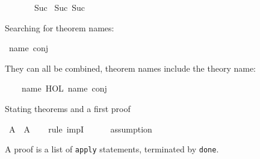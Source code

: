\begin{isabellebody}
\ {\isachardoublequoteopen}{\isacharunderscore}{\kern0pt}\ {\isacharplus}{\kern0pt}\ {\isacharunderscore}{\kern0pt}{\isachardoublequoteclose}\ {\isachardoublequoteopen}{\isacharunderscore}{\kern0pt}\ {\isacharless}{\kern0pt}\ {\isacharunderscore}{\kern0pt}{\isachardoublequoteclose}\ {\isachardoublequoteopen}Suc{\isachardoublequoteclose}\isanewline
{}\isamarkupfalse%
\ {\isachardoublequoteopen}Suc\ {\isacharparenleft}{\kern0pt}Suc\ {\isacharunderscore}{\kern0pt}{\isacharparenright}{\kern0pt}{\isachardoublequoteclose}%
\begin{isamarkuptext}%
Searching for theorem names:%
\end{isamarkuptext}\isamarkuptrue%
\isamarkupfalse%
\ name{\isacharcolon}{\kern0pt}\ {\isachardoublequoteopen}conj{\isachardoublequoteclose}%
\begin{isamarkuptext}%
They can all be combined, theorem names include the theory name:%
\end{isamarkuptext}\isamarkuptrue%
\isamarkupfalse%
\ {\isachardoublequoteopen}{\isacharunderscore}{\kern0pt}\ {\isasymand}\ {\isacharunderscore}{\kern0pt}{\isachardoublequoteclose}\ name{\isacharcolon}{\kern0pt}\ {\isachardoublequoteopen}HOL{\isachardot}{\kern0pt}{\isachardoublequoteclose}\ {\isacharminus}{\kern0pt}name{\isacharcolon}{\kern0pt}\ {\isachardoublequoteopen}conj{\isachardoublequoteclose}%
\isadelimdocument
%
\endisadelimdocument
%
\isatagdocument
%
\isamarkuptrue%
%
\endisatagdocument
{\isafolddocument}%
%
\isadelimdocument
%
\endisadelimdocument
%
\begin{isamarkuptext}%
Stating theorems and a first proof%
\end{isamarkuptext}\isamarkuptrue%
\isamarkupfalse%
\ {\isachardoublequoteopen}A\ {\isasymlongrightarrow}\ A{\isachardoublequoteclose}\isanewline
%
\isadelimproof
\ \ %
\endisadelimproof
%
\isatagproof
{}\isamarkupfalse%
\ {\isacharparenleft}{\kern0pt}rule\ impI{\isacharparenright}{\kern0pt}\ \ \isanewline
\ \ \isamarkupfalse%
\ assumption\isanewline
\ \ \isamarkupfalse%
%
\endisatagproof
{\isafoldproof}%
%
\isadelimproof
%
\endisadelimproof
%
\begin{isamarkuptext}%
A proof is a list of {\tt apply} statements, terminated by {\tt done}.


\end{isamarkuptext}
\end{isabellebody}

